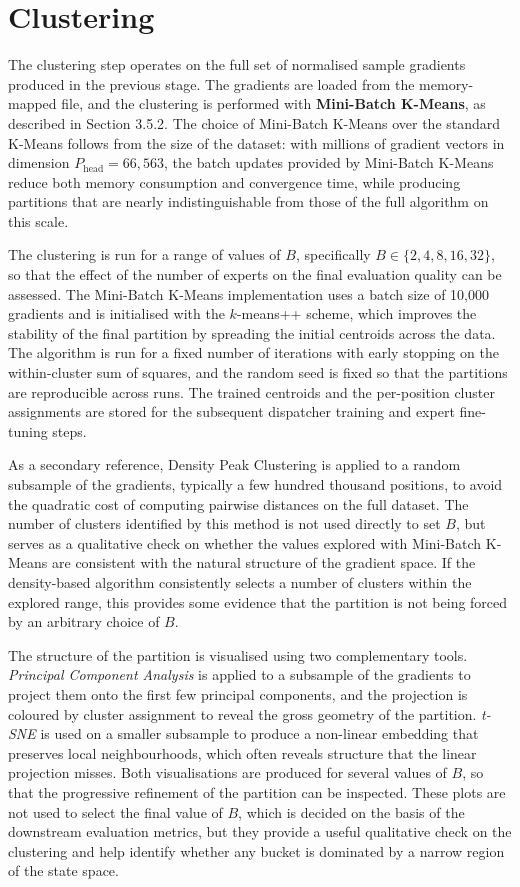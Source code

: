 \section{Clustering}
The clustering step operates on the full set of normalised sample gradients produced in the previous stage. The gradients are loaded from the memory-mapped file, and the clustering is performed with \textbf{Mini-Batch K-Means}, as described in Section 3.5.2. The choice of Mini-Batch K-Means over the standard K-Means follows from the size of the dataset: with millions of gradient vectors in dimension $P_{\text{head}} = 66,563$, the batch updates provided by Mini-Batch K-Means reduce both memory consumption and convergence time, while producing partitions that are nearly indistinguishable from those of the full algorithm on this scale.

The clustering is run for a range of values of $B$, specifically $B \in \{2, 4, 8, 16, 32\}$, so that the effect of the number of experts on the final evaluation quality can be assessed. The Mini-Batch K-Means implementation uses a batch size of 10,000 gradients and is initialised with the $k$-means++ scheme, which improves the stability of the final partition by spreading the initial centroids across the data. The algorithm is run for a fixed number of iterations with early stopping on the within-cluster sum of squares, and the random seed is fixed so that the partitions are reproducible across runs. The trained centroids and the per-position cluster assignments are stored for the subsequent dispatcher training and expert fine-tuning steps.

As a secondary reference, Density Peak Clustering is applied to a random subsample of the gradients, typically a few hundred thousand positions, to avoid the quadratic cost of computing pairwise distances on the full dataset. The number of clusters identified by this method is not used directly to set $B$, but serves as a qualitative check on whether the values explored with Mini-Batch K-Means are consistent with the natural structure of the gradient space. If the density-based algorithm consistently selects a number of clusters within the explored range, this provides some evidence that the partition is not being forced by an arbitrary choice of $B$.

The structure of the partition is visualised using two complementary tools. \emph{Principal Component Analysis} is applied to a subsample of the gradients to project them onto the first few principal components, and the projection is coloured by cluster assignment to reveal the gross geometry of the partition. \emph{t-SNE} is used on a smaller subsample to produce a non-linear embedding that preserves local neighbourhoods, which often reveals structure that the linear projection misses. Both visualisations are produced for several values of $B$, so that the progressive refinement of the partition can be inspected. These plots are not used to select the final value of $B$, which is decided on the basis of the downstream evaluation metrics, but they provide a useful qualitative check on the clustering and help identify whether any bucket is dominated by a narrow region of the state space.

